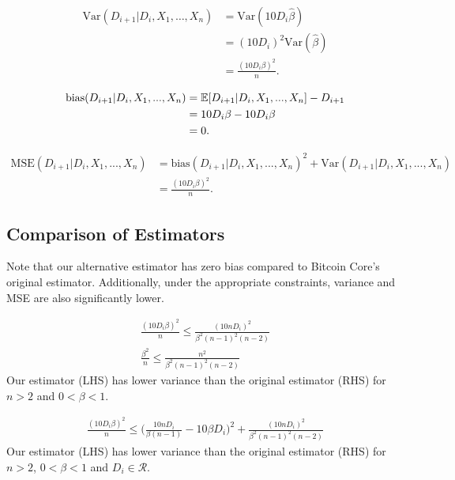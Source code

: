 \begin{align}
\text{Var}(D_{i+1} | D_{i}, X_1, \dots, X_{n}) &= \text{Var}(10 D_i \hat{\beta}) \\
&= (10 D_i)^2 \text{Var}(\hat{\beta}) \\
&= \frac{(10 D_i\beta)^2}{n}.
\end{align}

\begin{align}
\text{bias}(D_{i+1}|D_i,X_1,...,X_n) &= \operatorname{\mathbb{E}}[D_{i+1}|D_i,X_1,...,X_n] - D_{i+1} \\
&= 10 D_i\beta - 10 D_i\beta \\
&= 0.
\end{align}

\begin{align}
\text{MSE}(D_{i+1}|D_i,X_1,...,X_n) &= \text{bias}(D_{i+1}|D_i,X_1,...,X_n)^2 + \text{Var}(D_{i+1}|D_i,X_1,...,X_n) \\
&= \frac{(10 D_i\beta)^2}{n}.
\end{align}

\subsection{Comparison of Estimators}
Note that our alternative estimator has zero bias compared to Bitcoin Core's original estimator. Additionally, under the appropriate constraints, variance and MSE are also significantly lower.
\par \noindent {}
\begin{align}
\frac{(10 D_i\beta)^2}{n} \leq \frac{(10n D_i)^2}{\beta^2(n-1)^2(n-2)} \\
\frac{\beta^2}{n} \leq \frac{n^2}{\beta^2(n-1)^2(n-2)} 
\end{align}
Our estimator (LHS) has lower variance than the original estimator (RHS) for $n>2$ and $0<\beta<1$.

\begin{align}
\frac{(10 D_i\beta)^2}{n} \leq \Bigg(\frac{10n D_i}{\beta(n-1)} - 10\beta D_i\Bigg)^2 + \frac{(10n D_i)^2}{\beta^2(n-1)^2(n-2)}
\end{align}
Our estimator (LHS) has lower variance than the original estimator (RHS) for $n>2$, $0<\beta<1$ and $D_i \in \mathcal{R}$. 


